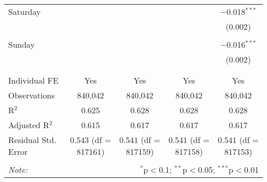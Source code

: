 \documentclass[
]{article}
\begin{document}
\begin{table}[!htbp]
{\begin{tabular}{@{\extracolsep{5pt}}lcccc}
 Saturday &  &  &  & $-$0.018$^{***}$ \\ 
  &  &  &  & (0.002) \\ 
  & & & & \\ 
 Sunday &  &  &  & $-$0.016$^{***}$ \\ 
  &  &  &  & (0.002) \\ 
  & & & & \\ 
\hline \\[-1.8ex] 
Individual FE & Yes & Yes & Yes & Yes \\ 
Observations & 840,042 & 840,042 & 840,042 & 840,042 \\ 
R$^{2}$ & 0.625 & 0.628 & 0.628 & 0.628 \\ 
Adjusted R$^{2}$ & 0.615 & 0.617 & 0.617 & 0.617 \\ 
Residual Std. Error & 0.543 (df = 817161) & 0.541 (df = 817159) & 0.541 (df = 817158) & 0.541 (df = 817153) \\ 
\hline 
\hline \\[-1.8ex] 
\textit{Note:}  & \multicolumn{4}{r}{$^{*}$p$<$0.1; $^{**}$p$<$0.05; $^{***}$p$<$0.01} \\ 
\end{tabular}
} 
\end{table} 
\newpage
\end{document}
